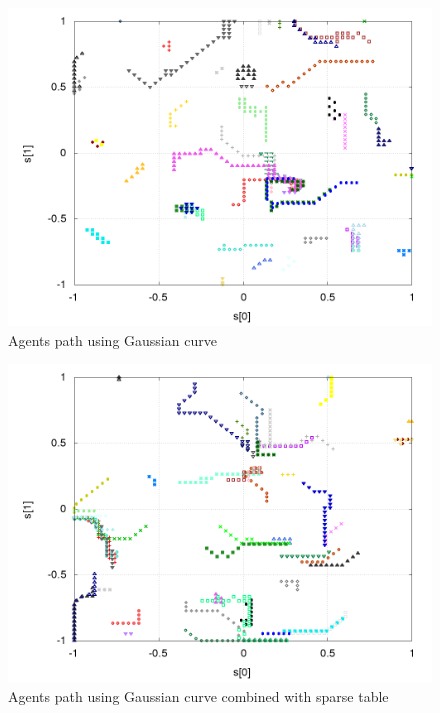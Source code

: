 \documentclass{acmbulletin}
\begin{document}
\begin{figure}[!htb]
\centering
\includegraphics[scale=.3]{../../results_q_learning/map_2/function_type_2/iterations_10/agents_path_surface.png}
\caption{Agents path using Gaussian curve}
\label{img:experiment_gauss_path}
\end{figure}


\begin{figure}[!htb]
\centering
\includegraphics[scale=.3]{../../results_q_learning/map_2/function_type_3/iterations_10/agents_path_surface.png}
\caption{Agents path using Gaussian curve combined with sparse table}
\label{img:experiment_gauss_sparse_table_path}
\end{figure}
\end{document}

